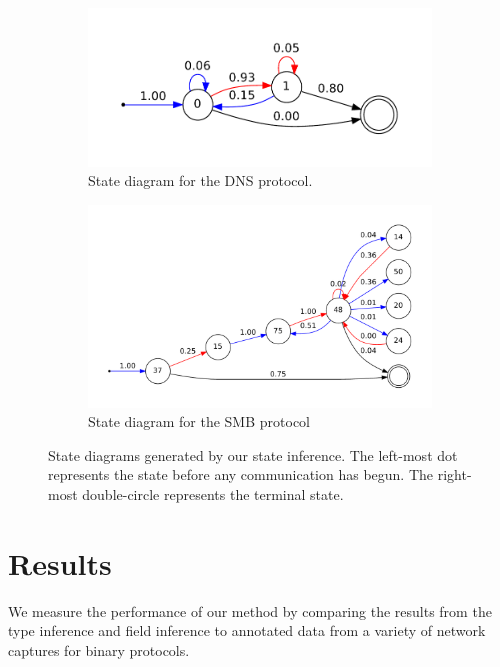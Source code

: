 \documentclass[a4paper]{report}
\begin{document}
\begin{figure}[h]
    \centering
    \begin{subfigure}[b]{0.48\textwidth}
        \includegraphics[width=\textwidth]{dnsstate}
        \caption{State diagram for the DNS protocol.}
        \label{fig:dnsstate}
    \end{subfigure}
    \quad
    \begin{subfigure}[b]{0.48\textwidth}
        \includegraphics[width=\textwidth]{smbstate}
        \caption{State diagram for the SMB protocol}
        \label{fig:smbstate}
    \end{subfigure}
    \caption{State diagrams generated by our state inference. The left-most
        dot represents the state before any communication has begun. The
        right-most double-circle represents the terminal state.}
    \label{fig:states}
\end{figure}

\chapter{Results}
We measure the performance of our method by comparing the results from the
type inference and field inference to annotated data from a variety of network
captures for binary protocols.
\end{document}
